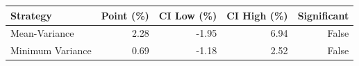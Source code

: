 \begin{tabular}{lrrrr}
\toprule
Strategy & Point (\%) & CI Low (\%) & CI High (\%) & Significant \\
\midrule
Mean-Variance & 2.28 & -1.95 & 6.94 & False \\
Minimum Variance & 0.69 & -1.18 & 2.52 & False \\
\bottomrule
\end{tabular}
